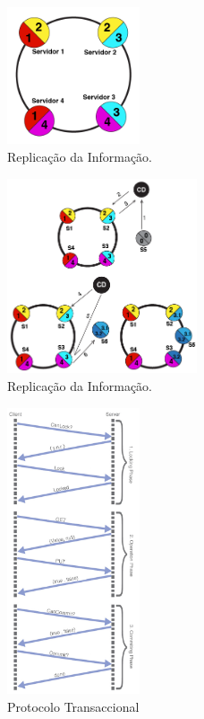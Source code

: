 \documentclass[times, 10pt,twocolumn]{article}
\begin{document}
\begin{figure}[H]
\centering
\includegraphics[width=0.35\textwidth]{replication}
\caption{Replicação da Informação.}
\end{figure}
\begin{figure}[H]
\centering
\includegraphics[width=0.5\textwidth]{replicationAlgorithm}
\caption{Replicação da Informação.}
\end{figure}
\begin{figure}[H]
\centering
\includegraphics[width=0.35\textwidth]{TransactionDiagram}
 \caption{Protocolo Transaccional}
\end{figure}
\end{document}

